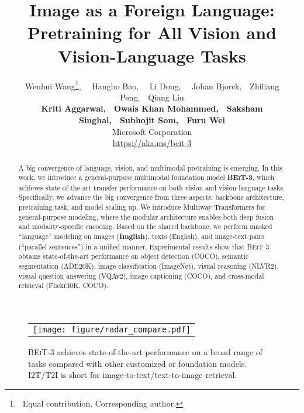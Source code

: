\documentclass{article}
\title{Image as a Foreign Language: \beit{} Pretraining for All Vision and Vision-Language Tasks}
\author{Wenhui Wang\thanks{~Equal contribution.  Corresponding author.}, ~~Hangbo Bao\footnotemark[1], ~~Li Dong\footnotemark[1], ~~Johan Bjorck,~~Zhiliang Peng,~~Qiang Liu \\\textbf{Kriti Aggarwal,}~~\textbf{Owais Khan Mohammed,}~~\textbf{Saksham Singhal,}~~\textbf{Subhojit Som,}~~\textbf{Furu Wei} \\
Microsoft Corporation \\
\url{https://aka.ms/beit-3}
}
\newcommand\our{\textsc{BEiT-3}}
\newcommand\multiway{Multiway Transformers}
\begin{document}
\maketitle

\vspace{-6mm}
\begin{abstract}
A big convergence of language, vision, and multimodal pretraining is emerging. In this work, we introduce a general-purpose multimodal foundation model \textbf{\our{}}, which achieves state-of-the-art transfer performance on both vision and vision-language tasks. Specifically, we advance the big convergence from three aspects: backbone architecture, pretraining task, and model scaling up. We introduce \multiway{} for general-purpose modeling, where the modular architecture enables both deep fusion and modality-specific encoding. Based on the shared backbone, we perform masked ``language'' modeling on images ({\textbf{Imglish}}), texts (English), and image-text pairs (``parallel sentences'') in a unified manner. Experimental results show that \our{} obtains state-of-the-art performance on object detection (COCO), semantic segmentation (ADE20K), image classification (ImageNet), visual reasoning (NLVR2), visual question answering (VQAv2), image captioning (COCO), and cross-modal retrieval (Flickr30K, COCO).
\end{abstract}


\vspace{-5mm}
\begin{figure}[h]
\begin{center}
\begin{tabular}{c}
\texttt{[image: figure/radar\_compare.pdf]}
\end{tabular}
\end{center}
\vspace{-2mm}
\caption{\our{} achieves state-of-the-art performance on a broad range of tasks compared with other customized or foundation models. I2T/T2I is short for image-to-text/text-to-image retrieval. 
}
\label{fig:radar_compare}
\end{figure}
\end{document}
